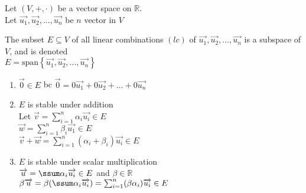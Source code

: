 \documentclass[12pt]{article}
\renewcommand{\v}[1]{\overrightarrow{#1}}
\newcommand{\real}[0]{\mathbb{R}}
\newenvironment{proof}{\block[Proof]}{\endblock}
\newenvironment{proposition}{\block[Proposition]}{\endblock}
\newcommand{\bb}[1]{\left\{#1\right\}}
\newcommand{\sspan}[1]{\text{span}\bb{#1}}
\begin{document}
	Let $(V, +, \cdot)$ be a vector space on $\real$. \\
	Let $\v{u_1}, \v{u_2}, ..., \v{u_n}$ be $n$ vector in $V$ 
	
	\begin{proposition}
		The subset $E \subseteq V$ of all linear combinations $(lc)$ of $\v{u_1}, \v{u_2}, ..., \v{u_n}$ is a subspace of $V$, and is denoted \\
		$E = \sspan{\v{u_1}, \v{u_2}, ..., \v{u_n}}$
		
		\begin{proof}
			\begin{enumerate}
				\item $\v{0} \in E$ bc $\v{0} = 0 \v{u_1} + 0 \v{u_2} + ... + 0 \v{u_n}$
				\item $E$ is stable under addition \\
				Let $\v{v} = \sum_{i=1}^n \alpha_i \v{u_i} \in E$ \\
				$\v{w} = \sum_{i=1}^n \beta_i \v{u_1} \in E$ \\
				$\v{v} + \v{w} = \sum_{i=1}^n (\alpha_i + \beta_i) \v{u_i} \in E$
				\item $E$ is stable under scalar multiplication \\
				$\v{u} =  \ssum \alpha_i \v{u_i} \in E$ and $\beta \in \real$ \\
				$\beta \v{u} = \beta(\ssum \alpha_i \v{u_i}) = \sum_{i=1}^n (\beta \alpha_i) \v{u_i} \in E$
			\end{enumerate}
		\end{proof}
	\end{proposition}
	
\end{document}
